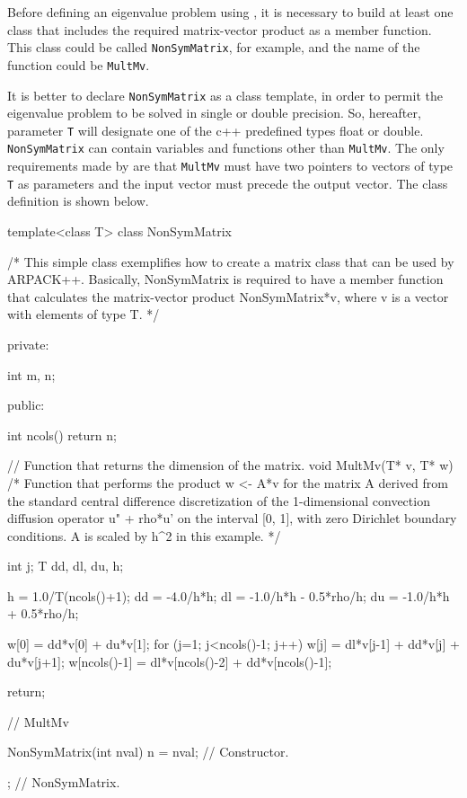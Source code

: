 Before defining an eigenvalue problem using \ARPP{}, it is necessary to build at least one class that includes the required matrix-vector product as a member function. This class could be called \texttt{NonSymMatrix}, for example, and the name of the function could be \texttt{MultMv}.

It is better to declare \texttt{NonSymMatrix} as a class template, in order to permit the eigenvalue problem to be solved in single or double precision. So, hereafter, parameter \texttt{T} will designate one of the c++ predefined types float or double. \texttt{NonSymMatrix} can contain variables and functions other than \texttt{MultMv}. The only requirements made by \ARPP{} are that \texttt{MultMv} must have two pointers to vectors of type \texttt{T} as parameters and the input vector must precede the output vector. The class definition is shown below.

\begin{cppcode}
template<class T>
class NonSymMatrix {
	/*
	This simple class exemplifies how to create a matrix class that
	can be used by ARPACK++. Basically, NonSymMatrix is required to 
	have a member function that calculates the matrix-vector product
	NonSymMatrix*v, where v is a vector with elements of type T.
	*/
	
	private:
	
	int m, n;
	
	public:
	
	int ncols() { return n; }
	
	// Function that returns the dimension of the matrix.
	void MultMv(T* v, T* w)
	/*
	Function that performs the product w <- A*v for the matrix A
	derived from the standard central difference discretization of
	the 1-dimensional convection diffusion operator u" + rho*u' on
	the interval [0, 1], with zero Dirichlet boundary conditions.
	A is scaled by h^2 in this example.
	*/
	{
		int  j;
		T    dd, dl, du, h;
		
		h  = 1.0/T(ncols()+1);
		dd = -4.0/h*h;
		dl = -1.0/h*h - 0.5*rho/h;
		du = -1.0/h*h + 0.5*rho/h;
		
		w[0] = dd*v[0] + du*v[1];
		for (j=1; j<ncols()-1; j++) {
			w[j] = dl*v[j-1] + dd*v[j] + du*v[j+1];
		}
		w[ncols()-1] = dl*v[ncols()-2] + dd*v[ncols()-1];
		
		return;
		
	} // MultMv
	
	NonSymMatrix(int nval) { n = nval; } 
	// Constructor.
	
}; // NonSymMatrix.
\end{cppcode}

